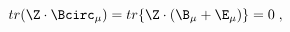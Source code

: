 \begin{equation}
\label{e5:47}
tr(\Z\cdot \Bcirc_{\mu}) = tr \{\Z \cdot (\B_{\mu}+\E_{\mu}) \} =0 \; ,
\end{equation}


